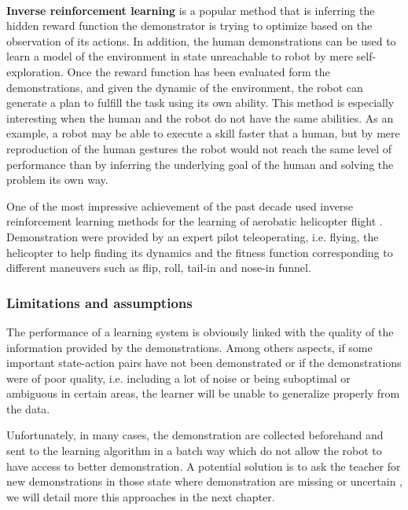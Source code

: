 \paragraph{} \textbf{Inverse reinforcement learning} \cite{ng2000algorithms,Abbeel04icml,macl09airl} is a popular method that is inferring the hidden reward function the demonstrator is trying to optimize based on the observation of its actions. In addition, the human demonstrations can be used to learn a model of the environment in state unreachable to robot by mere self-exploration. Once the reward function has been evaluated form the demonstrations, and given the dynamic of the environment, the robot can generate a plan to fulfill the task using its own ability. This method is especially interesting when the human and the robot do not have the same abilities. As an example, a robot may be able to execute a skill faster that a human, but by mere reproduction of the human gestures the robot would not reach the same level of performance than by inferring the underlying goal of the human and solving the problem its own way.

One of the most impressive achievement of the past decade used inverse reinforcement learning methods for the learning of aerobatic helicopter flight \cite{abbeel2007application}. Demonstration were provided by an expert pilot teleoperating, i.e. flying, the helicopter to help finding its dynamics and the fitness function corresponding to different maneuvers such as flip, roll, tail-in and nose-in funnel.

\subsubsection*{Limitations and assumptions}

The performance of a learning system is obviously linked with the quality of the information provided by the demonstrations. Among others aspects, if some important state-action pairs have not been demonstrated or if the demonstrations were of poor quality, i.e. including a lot of noise or being suboptimal or ambiguous in certain areas, the learner will be unable to generalize properly from the data. 

Unfortunately, in many cases, the demonstration are collected beforehand and sent to the learning algorithm in a batch way which do not allow the robot to have access to better demonstration. A potential solution is to ask the teacher for new demonstrations in those state where demonstration are missing or uncertain \cite{chernova2008multi,chernova09jair}, we will detail more this approaches in the next chapter.


